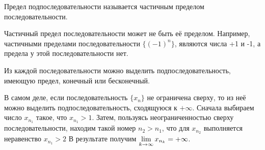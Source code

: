 \documentclass{article}
\begin{document}


Предел подпоследовательности называется
частичным пределом последовательности.


Частичный предел последовательности может не быть её пределом. Например, частичными пределами последовательности
$\{(-1)^n\}$, являются числа +1 и -1, а предела у этой последовательности нет.

\theorem{}

Из каждой последовательности можно выделить подпоследовательность, имеющую предел, конечный или
бесконечный.

\proof

В самом деле, если последовательность $\{x_n\}$ не ограничена
сверху, то из неё можно выделить подпоследовательность, сходящуюся к $+\infty$. Сначала выбираем число $x_{n_1}$
такое, что $x_{n_1}>1$.
Затем, пользуясь неограниченностью сверху последовательности,
находим такой номер $n_2>n_1$, что для $x_{n_2}$
выполняется неравенство $x_{n_1}>2$ В результате получим $\lim\limits_{k \to \infty} x_{n_k}=+\infty$.
\end{document}
